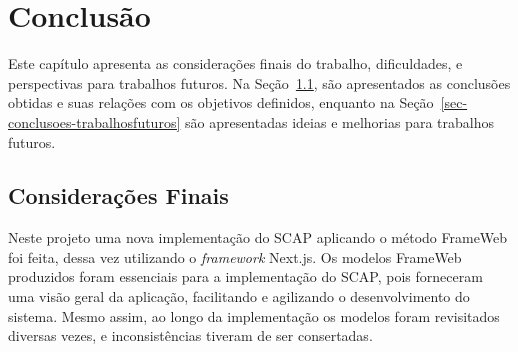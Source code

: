 \chapter{Conclusão}
\label{chap-conclusao}


Este capítulo apresenta as considerações finais do trabalho, dificuldades, e perspectivas para trabalhos futuros.
Na Seção~\ref{sec-conclusoes-consideracoes}, são apresentados as conclusões obtidas e suas relações com os objetivos definidos, enquanto
na Seção~\ref{sec-conclusoes-trabalhosfuturos} são apresentadas ideias e melhorias para trabalhos futuros.

\section{Considerações Finais}
\label{sec-conclusoes-consideracoes}



Neste projeto uma nova implementação do SCAP aplicando o método FrameWeb foi feita, dessa vez utilizando o \textit{framework} Next.js.
Os modelos FrameWeb produzidos foram essenciais para a implementação do SCAP, pois forneceram uma visão geral da aplicação, facilitando e agilizando o desenvolvimento do sistema.
Mesmo assim, ao longo da implementação os modelos foram revisitados diversas vezes, e inconsistências tiveram de ser consertadas.


